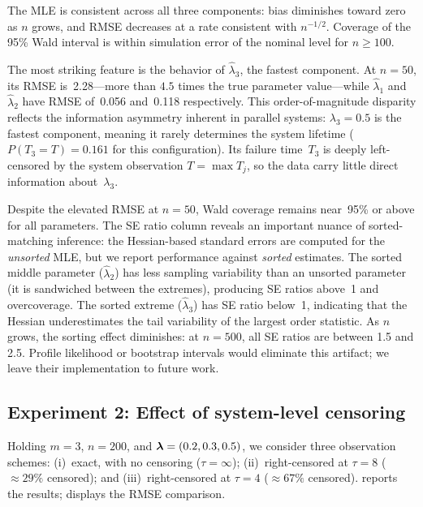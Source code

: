 The MLE is consistent across all three components: bias diminishes toward
zero as $n$ grows, and RMSE decreases at a rate consistent with $n^{-1/2}$.
Coverage of the 95\% Wald interval is within simulation error of the
nominal level for $n \geq 100$.

The most striking feature is the behavior of $\hat{\lambda}_3$, the
fastest component.  At $n = 50$, its RMSE is~2.28---more than
$4.5$ times the true parameter value---while $\hat{\lambda}_1$ and
$\hat{\lambda}_2$ have RMSE of~0.056 and~0.118 respectively.  This
order-of-magnitude disparity reflects the information asymmetry inherent in
parallel systems: $\lambda_3 = 0.5$ is the fastest component, meaning it
rarely determines the system lifetime ($P(T_3 = T) = 0.161$ for this
configuration).  Its failure time~$T_3$ is deeply left-censored by the
system observation $T = \max T_j$, so the data carry little direct
information about~$\lambda_3$.

Despite the elevated RMSE at $n = 50$, Wald coverage remains
near~95\% or above for all parameters.  The SE ratio column reveals an
important nuance of sorted-matching inference: the Hessian-based
standard errors are computed for the \emph{unsorted} MLE, but we report
performance against \emph{sorted} estimates.  The sorted middle
parameter ($\hat\lambda_2$) has less sampling variability than an
unsorted parameter (it is sandwiched between the extremes), producing
SE ratios above~1 and overcoverage.  The sorted extreme
($\hat\lambda_3$) has SE ratio below~1, indicating that the
Hessian underestimates the tail variability of the largest order
statistic.  As $n$ grows, the sorting effect diminishes: at $n = 500$,
all SE ratios are between 1.5 and 2.5.
Profile likelihood or bootstrap intervals would eliminate this artifact;
we leave their implementation to future work.


\subsection{Experiment 2: Effect of system-level censoring}
\label{sec:sim-censoring}

Holding $m = 3$, $n = 200$, and $\boldsymbol{\lambda} = (0.2, 0.3, 0.5)$, we consider
three observation schemes:
(i)~exact, with no censoring ($\tau = \infty$);
(ii)~right-censored at $\tau = 8$ (${\approx}29\%$ censored); and
(iii)~right-censored at $\tau = 4$ (${\approx}67\%$ censored).
 reports the results; 
displays the RMSE comparison.

